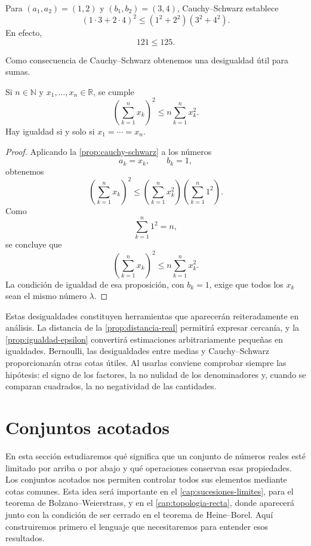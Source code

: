 \begin{example}
Para $(a_1,a_2)=(1,2)$ y $(b_1,b_2)=(3,4)$, Cauchy--Schwarz establece
\[
(1\cdot3+2\cdot4)^2
\leq
(1^2+2^2)(3^2+4^2).
\]
En efecto,
\[
121\leq125.
\]
\end{example}

Como consecuencia de Cauchy--Schwarz obtenemos una desigualdad útil para sumas.

\begin{samepage}
\begin{proposition}
\label{prop:suma-cuadrados}
Si $n\in\mathbb{N}$ y $x_1,\ldots,x_n\in\mathbb{R}$, se cumple
\[
\left(\sum_{k=1}^{n}x_k\right)^2
\leq
n\sum_{k=1}^{n}x_k^2.
\]
Hay igualdad si y solo si $x_1=\cdots=x_n$.
\end{proposition}
\end{samepage}

\begin{proof}
Aplicando la \cref{prop:cauchy-schwarz} a los números
\[
a_k=x_k,
\qquad
b_k=1,
\]
obtenemos
\[
\left(\sum_{k=1}^{n}x_k\right)^2
\leq
\left(\sum_{k=1}^{n}x_k^2\right)
\left(\sum_{k=1}^{n}1^2\right).
\]
Como
\[
\sum_{k=1}^{n}1^2=n,
\]
se concluye que
\[
\left(\sum_{k=1}^{n}x_k\right)^2
\leq
n\sum_{k=1}^{n}x_k^2.
\]
La condición de igualdad de esa proposición, con $b_k=1$, exige que todos los $x_k$ sean el mismo número $\lambda$.
\end{proof}

Estas desigualdades constituyen herramientas que aparecerán reiteradamente en análisis. La distancia de la \cref{prop:distancia-real} permitirá expresar cercanía, y la \cref{prop:igualdad-epsilon} convertirá estimaciones arbitrariamente pequeñas en igualdades. Bernoulli, las desigualdades entre medias y Cauchy--Schwarz proporcionarán otras cotas útiles. Al usarlas conviene comprobar siempre las hipótesis: el signo de los factores, la no nulidad de los denominadores y, cuando se comparan cuadrados, la no negatividad de las cantidades.

\section{Conjuntos acotados}
\label{sec:conjuntos-acotados}
En esta sección estudiaremos qué significa que un conjunto de números reales esté limitado por arriba o por abajo y qué operaciones conservan esas propiedades. Los conjuntos acotados nos permiten controlar todos sus elementos mediante cotas comunes. Esta idea será importante en el \cref{cap:sucesiones-limites}, para el teorema de Bolzano--Weierstrass, y en el \cref{cap:topologia-recta}, donde aparecerá junto con la condición de ser cerrado en el teorema de Heine--Borel. Aquí construiremos primero el lenguaje que necesitaremos para entender esos resultados.

